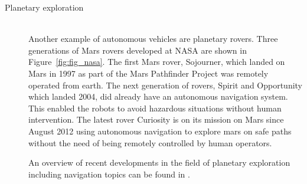\begin{description}
\item[Planetary exploration]\hfill \\
Another example of autonomous vehicles are planetary rovers.
Three generations of Mars rovers developed at NASA are shown in Figure~\ref{fig:fig_nasa}. 
The first Mars rover, Sojourner, which landed on Mars in 1997 as part of the Mars Pathfinder Project was remotely operated from earth. 
The next generation of rovers, Spirit and Opportunity which landed 2004, did already have an autonomous navigation system. This enabled the robots to avoid hazardous situations without human intervention. 
The latest rover Curiosity is on its mission on Mars since August 2012 using autonomous navigation to explore mars on safe paths without the need of being remotely controlled by human operators.

An overview of recent developments in the field of planetary exploration including navigation topics can be found in \cite{PavoneAcikmese2014rover}.


\end{description}
